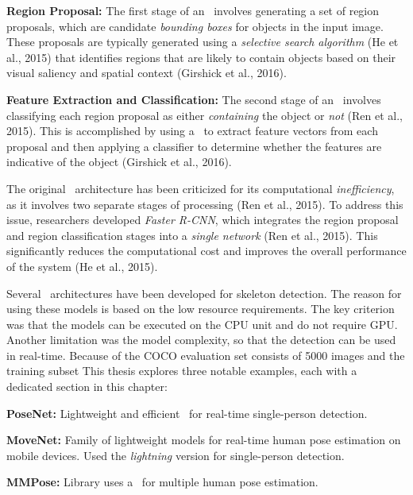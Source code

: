 \startitemize[1]
    \item {\bf Region Proposal:} The first stage of an \RCNN\ involves generating a set of region proposals, which are candidate {\em bounding boxes} for objects in the input image. These proposals are typically generated using a {\em selective search algorithm} (\scc He et al., 2015) that identifies regions that are likely to contain objects based on their visual saliency and spatial context (\scc Girshick et al., 2016).
    \item {\bf Feature Extraction and Classification:} The second stage of an \RCNN\ involves classifying each region proposal as either {\em containing} the object or {\em not} (\scc Ren et al., 2015). This is accomplished by using a \CNN\ to extract feature vectors from each proposal and then applying a classifier to determine whether the features are indicative of the object (\scc Girshick et al., 2016).
\stopitemize

The original \RCNN\ architecture has been criticized for its computational {\em inefficiency}, as it involves two separate stages of processing (\scc Ren et al., 2015). To address this issue, researchers developed {\em Faster R-CNN}, which integrates the region proposal and region classification stages into a {\em single network} (\scc Ren et al., 2015). This significantly reduces the computational cost and improves the overall performance of the system (\scc He et al., 2015).

Several \NN\ architectures have been developed for skeleton detection. The reason for using these models is based on the low resource requirements. The key criterion was that the models can be executed on the CPU unit and do not require GPU. Another limitation was the model complexity, so that the detection can be used in real-time. Because of the COCO evaluation set consists of 5000 images and the training subset  This thesis explores three notable examples, each with a dedicated section in this chapter:

\startitemize[n]
    \item {\bf PoseNet:} Lightweight and efficient \CNN\ for real-time single-person detection.
    \item {\bf MoveNet:} Family of lightweight models for real-time human pose estimation on mobile devices. Used the {\em lightning} version for single-person detection.
    \item {\bf MMPose:} Library uses a \CNN\ for multiple human pose estimation.
\stopitemize


